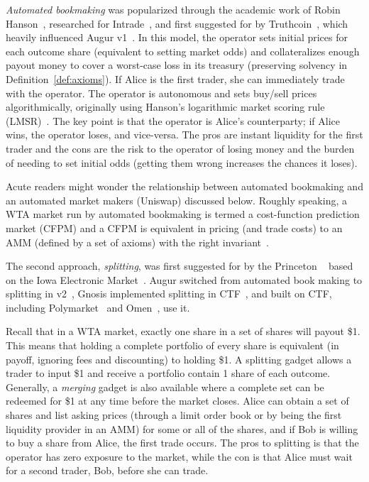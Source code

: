 \textit{Automated bookmaking} was popularized through the academic work of Robin Hanson~\cite{Ha03,Han07b}, researched for Intrade~\cite{McC08}, and first suggested for \depms by Truthcoin~\cite{Sz14}, which heavily influenced Augur v1~\cite{AKPWZ15}. In this model, the operator sets initial prices for each outcome share (equivalent to setting market odds) and collateralizes enough payout money to cover a worst-case loss in its treasury (preserving solvency in Definition~\ref{def:axioms}). If Alice is the first trader, she can immediately trade with the operator. The operator is autonomous and sets buy/sell prices algorithmically, originally using Hanson's logarithmic market scoring rule (LMSR)~\cite{Han07b}. The key point is that the operator is Alice's counterparty; if Alice wins, the operator loses, and vice-versa. The pros are instant liquidity for the first trader and the cons are the risk to the operator of losing money and the burden of needing to set initial odds (getting them wrong increases the chances it loses). 

Acute readers might wonder the relationship between automated bookmaking and  an automated market makers (\eg Uniswap) discussed below. Roughly speaking, a WTA market run by automated bookmaking is termed a cost-function prediction market (CFPM) and a CFPM is equivalent in pricing (and trade costs) to an AMM (defined by a set of axioms) with the right invariant~\cite{FPW23}.

The second approach, \textit{splitting}, was first suggested for \depms by the Princeton \depm~\cite{BCFKMN14} based on the Iowa Electronic Market~\cite{iem}. Augur switched from automated book making to splitting in v2~\cite{AKPWZ19}, Gnosis implemented splitting in CTF~\cite{ctf}, and \depms built on CTF, including Polymarket~\cite{poly} and Omen~\cite{Omen_docs}, use it.

Recall that in a WTA market, exactly one share in a set of shares will payout \$1. This means that holding a complete portfolio of every share is equivalent (in payoff, ignoring fees and discounting) to holding \$1. A splitting gadget allows a trader to input \$1 and receive a portfolio contain 1 share of each outcome. Generally, a \textit{merging} gadget is also available where a complete set can be redeemed for \$1 at any time before the market closes. Alice can obtain a set of shares and list asking prices (through a limit order book or by being the first liquidity provider in an AMM) for some or all of the shares, and if Bob is willing to buy a share from Alice, the first trade occurs. The pros to splitting is that the operator has zero exposure to the market, while the con is that Alice must wait for a second trader, Bob, before she can trade. 

